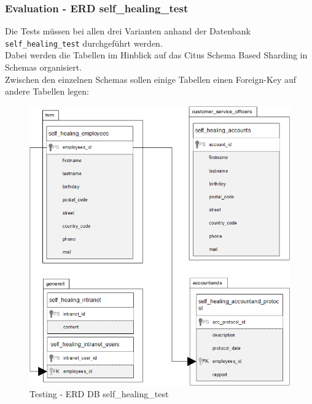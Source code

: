 \begin{flushleft}
    \subsubsection{Evaluation - ERD self\_healing\_test}
    \label{subsubsec:erd_self_healing_test}
    Die Tests müssen bei allen drei Varianten anhand der Datenbank \texttt{self\_healing\_test} durchgeführt werden.\\
    Dabei werden die Tabellen im Hinblick auf das Citus Schema Based Sharding in Schemas organisiert.\\
    Zwischen den einzelnen Schemas sollen einige Tabellen einen Foreign-Key auf andere Tabellen legen:
    \begin{figure}[H]
        \centering
        \includegraphics[width=0.5\linewidth]{source/implementation/evaluation/evaluation_tests/erd_self_healing_test}
        \caption{Testing - ERD DB self\_healing\_test}
        \label{fig:erd_self_healing_test}
    \end{figure}
\end{flushleft}